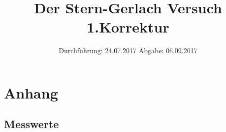 

\subject{V25}
\title{Der Stern-Gerlach Versuch 1.Korrektur}
\date{
  Durchführung: 24.07.2017
  \hspace{3em}
  Abgabe: 06.09.2017
}



\maketitle
\thispagestyle{empty}
\tableofcontents
\newpage





\printbibliography
\newpage

\section{Anhang}
\label{sec:anhang}

\subsection{Messwerte}
\label{sec:mess}








